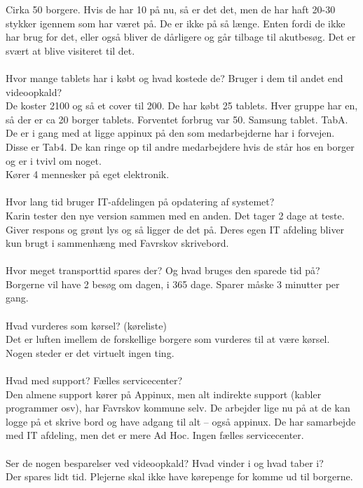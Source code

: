 Cirka 50 borgere. Hvis de har 10 på nu, så er det det, men de har haft 20-30 stykker igennem som har været på. De er ikke på så længe. Enten fordi de ikke har brug for det, eller også bliver de dårligere og går tilbage til akutbesøg. Det er svært at blive visiteret til det. \\\\
Hvor mange tablets har i købt og hvad kostede de? Bruger i dem til andet end videoopkald?\\
De koster 2100 og så et cover til 200. De har købt 25 tablets. Hver gruppe har en, så der er ca 20 borger tablets. Forventet forbrug var 50. Samsung tablet. TabA. \\
De er i gang med at ligge appinux på den som medarbejderne har i forvejen. Disse er Tab4. De kan ringe op til andre medarbejdere hvis de står hos en borger og er i tvivl om noget. \\
Kører 4 mennesker på eget elektronik. \\\\
Hvor lang tid bruger IT-afdelingen på opdatering af systemet? \\
Karin tester den nye version sammen med en anden. Det tager 2 dage at teste. Giver respons og grønt lys og så ligger de det på. Deres egen IT afdeling bliver kun brugt i sammenhæng med Favrskov skrivebord.\\\\ 
Hvor meget transporttid spares der? Og hvad bruges den sparede tid på?\\
Borgerne vil have 2 besøg om dagen, i 365 dage. Sparer måske 3 minutter per gang. \\\\
Hvad vurderes som kørsel? (køreliste) \\
Det er luften imellem de forskellige borgere som vurderes til at være kørsel. Nogen steder er det virtuelt ingen ting. \\\\
Hvad med support? Fælles servicecenter?\\
Den almene support kører på Appinux, men alt indirekte support (kabler programmer osv), har Favrskov kommune selv. De arbejder lige nu på at de kan logge på et skrive bord og have adgang til alt – også appinux. De har samarbejde med IT afdeling, men det er mere Ad Hoc. Ingen fælles servicecenter. \\\\
Ser de nogen besparelser ved videoopkald? Hvad vinder i og hvad taber i? \\
Der spares lidt tid. Plejerne skal ikke have kørepenge for komme ud til borgerne. \\
